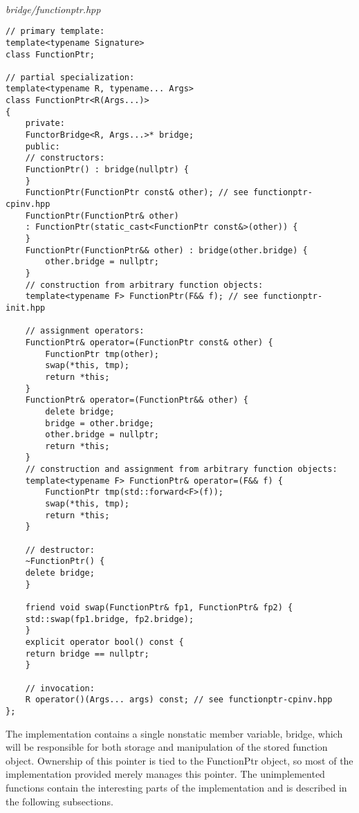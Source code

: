 \hspace*{\fill} \\ %
\noindent
\textit{bridge/functionptr.hpp}
\begin{lstlisting}[style=styleCXX]
// primary template:
template<typename Signature>
class FunctionPtr;

// partial specialization:
template<typename R, typename... Args>
class FunctionPtr<R(Args...)>
{
	private:
	FunctorBridge<R, Args...>* bridge;
	public:
	// constructors:
	FunctionPtr() : bridge(nullptr) {
	}
	FunctionPtr(FunctionPtr const& other); // see functionptr-cpinv.hpp
	FunctionPtr(FunctionPtr& other)
	: FunctionPtr(static_cast<FunctionPtr const&>(other)) {
	}
	FunctionPtr(FunctionPtr&& other) : bridge(other.bridge) {
		other.bridge = nullptr;
	}
	// construction from arbitrary function objects:
	template<typename F> FunctionPtr(F&& f); // see functionptr-init.hpp
	
	// assignment operators:
	FunctionPtr& operator=(FunctionPtr const& other) {
		FunctionPtr tmp(other);
		swap(*this, tmp);
		return *this;
	}
	FunctionPtr& operator=(FunctionPtr&& other) {
		delete bridge;
		bridge = other.bridge;
		other.bridge = nullptr;
		return *this;
	}
	// construction and assignment from arbitrary function objects:
	template<typename F> FunctionPtr& operator=(F&& f) {
		FunctionPtr tmp(std::forward<F>(f));
		swap(*this, tmp);
		return *this;
	}

	// destructor:
	~FunctionPtr() {
	delete bridge;
	}

	friend void swap(FunctionPtr& fp1, FunctionPtr& fp2) {
	std::swap(fp1.bridge, fp2.bridge);
	}
	explicit operator bool() const {
	return bridge == nullptr;
	}

	// invocation:
	R operator()(Args... args) const; // see functionptr-cpinv.hpp
};
\end{lstlisting}

The implementation contains a single nonstatic member variable, bridge, which will be responsible for both storage and manipulation of the stored function object. Ownership of this pointer is tied to the FunctionPtr object, so most of the implementation provided merely manages this pointer. The unimplemented functions contain the interesting parts of the implementation and is described in the following subsections.






































